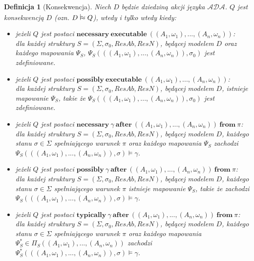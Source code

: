 \documentclass[11pt,a4paper]{article}
\newtheorem{definition}{Definicja}[section]
\newcommand{\vapprox}{\mathrel{\scalebox{1}[2]{$\shortmid$}\mkern-3.1mu\raisebox{0.1ex}{$\approx$}}}
\begin{document}
    \begin{definition}[Konsekwencja]
    	Niech $D$ będzie dziedziną akcji języka $\mathcal{ADA}$. $Q$ jest konsekwencją $D$ (ozn. $D \vapprox Q$), wtedy i tylko wtedy kiedy:
    
    \begin{itemize}
    	\item jeżeli $Q$ jest postaci $\mathbf{necessary}~\mathbf{executable}~((A_1, \omega_1),...,(A_n,\omega_n))$: \\ dla każdej struktury $S=(\Sigma, \sigma_0, ResAb, ResN)$, będącej modelem $D$ oraz każdego mapowania $\Psi_S$, $\Psi_S(((A_1, \omega_1), ..., (A_n, \omega_n)), \sigma_0)$ jest zdefiniowane.
    	
    	\item jeżeli $Q$ jest postaci $\mathbf{possibly}~\mathbf{executable}~((A_1, \omega_1),...,(A_n,\omega_n))$: \\ dla każdej struktury $S=(\Sigma, \sigma_0, ResAb, ResN)$, będącej modelem $D$, istnieje mapowanie $\Psi_S$, takie że $\Psi_S(((A_1, \omega_1), ..., (A_n, \omega_n)), \sigma_0)$ jest zdefiniowane.
    	
    	\item jeżeli $Q$ jest postaci $\mathbf{necessary}~\gamma~\mathbf{after}~((A_1, \omega_1),...,(A_n,\omega_n))~\mathbf{from}~\pi$: \\
    	dla każdej struktury $S=(\Sigma, \sigma_0, ResAb, ResN)$, będącej modelem $D$, każdego stanu $\sigma \in \Sigma$ spełniającego warunek $\pi$ oraz każdego mapowania $\Psi_S$ zachodzi $\Psi_S(((A_1, \omega_1), ..., (A_n, \omega_n)), \sigma) \models \gamma$.
    	
    	\item jeżeli $Q$ jest postaci $\mathbf{possibly}~\gamma~\mathbf{after}~((A_1, \omega_1),...,(A_n,\omega_n))~\mathbf{from}~\pi$: \\
    	dla każdej struktury $S=(\Sigma, \sigma_0, ResAb, ResN)$, będącej modelem $D$, każdego stanu $\sigma \in \Sigma$ spełniającego warunek $\pi$ istnieje mapowanie $\Psi_S$, takie że zachodzi $\Psi_S(((A_1, \omega_1), ..., (A_n, \omega_n)), \sigma) \models \gamma$.
    	
    	\item jeżeli $Q$ jest postaci $\mathbf{typically}~\gamma~\mathbf{after}~((A_1, \omega_1),...,(A_n,\omega_n))~\mathbf{from}~\pi$: \\
    	dla każdej struktury $S=(\Sigma, \sigma_0, ResAb, ResN)$, będącej modelem $D$, każdego stanu $\sigma \in \Sigma$ spełniającego warunek $\pi$ oraz każdego mapowania $\Psi_S^{*} \in \Pi_S((A_1, \omega_1),...,(A_n,\omega_n))$ zachodzi $\Psi_S^{*}(((A_1, \omega_1), ..., (A_n, \omega_n)), \sigma) \models \gamma$.
    	

\end{itemize}
\end{definition}
\end{document}
